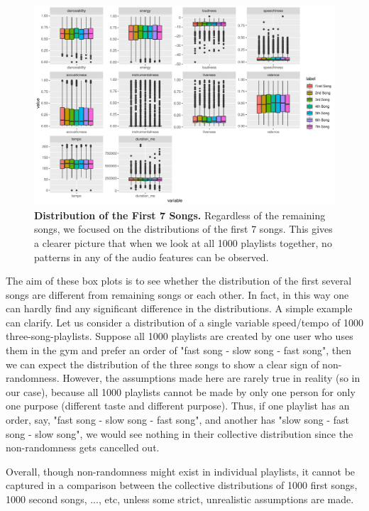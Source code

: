 \documentclass[12pt]{article}
\theoremstyle{plain}
\theoremstyle{definition}
\theoremstyle{remark}
\begin{document}
\newpage
\begin{figure}[h]
    \centering
    \includegraphics[width=\textwidth]{Images/1st7.pdf}
    \caption{\textbf{Distribution of the First 7 Songs.} Regardless of the remaining songs, we focused on the distributions of the first 7 songs. This gives a clearer picture that when we look at all 1000 playlists together, no patterns in any of the audio features can be observed.}
    \label{fig:1st7}
\end{figure}


The aim of these box plots is to see whether the distribution of the first several songs are different from remaining songs or each other. In fact, in this way one can hardly find any significant difference in the distributions. A simple example can clarify. Let us consider a distribution of a single variable speed/tempo of 1000 three-song-playlists. Suppose all 1000 playlists are created by one user who uses them in the gym and prefer an order of "fast song - slow song - fast song", then we can expect the distribution of the three songs to show a clear sign of non-randomness. However, the assumptions made here are rarely true in reality (so in our case), because all 1000 playlists cannot be made by only one person for only one purpose (different taste and different purpose). Thus, if one playlist has an order, say, "fast song - slow song - fast song", and another has "slow song - fast song - slow song", we would see nothing in their collective distribution since the non-randomness gets cancelled out. 

Overall, though non-randomness might exist in individual playlists, it cannot be captured in a comparison between the collective distributions of 1000 first songs, 1000 second songs, ..., etc, unless some strict, unrealistic assumptions are made. 
\end{document}
